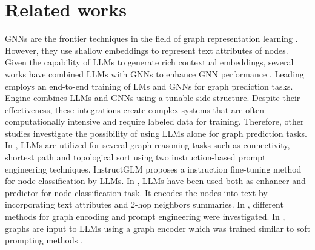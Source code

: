 \section{Related works}
GNNs are the frontier techniques in the field of graph representation learning \cite{zhang2020deep, khoshraftar2024survey}. However, they use shallow embeddings to represent text attributes of nodes. Given the capability of LLMs to generate rich contextual embeddings, several works have combined LLMs with GNNs to enhance GNN performance \cite{he2023harnessing, duan2023frustratingly, yu2023empower, zhu2024efficient,xue2023efficient}. Leading \cite{xue2023efficient} employs an end-to-end training of LMs and GNNs for graph prediction tasks. Engine \cite{zhu2024efficient} combines LLMs and GNNs using a tunable side structure. Despite their effectiveness, these integrations create complex systems that are often computationally intensive and require labeled data for training.
Therefore, other studies investigate the possibility of using LLMs alone for graph prediction tasks. 
In \cite{wang2024can}, LLMs are utilized for several graph reasoning tasks such as connectivity, shortest path and topological sort using two instruction-based prompt engineering techniques. InstructGLM \cite{ye2024language} proposes a instruction fine-tuning method for node classification by LLMs. In \cite{chen2024exploring}, LLMs have been used both as enhancer and predictor for node classification task. It encodes the nodes into text by incorporating text attributes and 2-hop neighbors summaries. In \cite{fatemitalk}, different methods for graph encoding and prompt engineering were investigated. In \cite{perozzi2024let}, graphs are input to LLMs using a graph encoder which was trained similar to soft prompting methods \cite{lester2021power}. 
